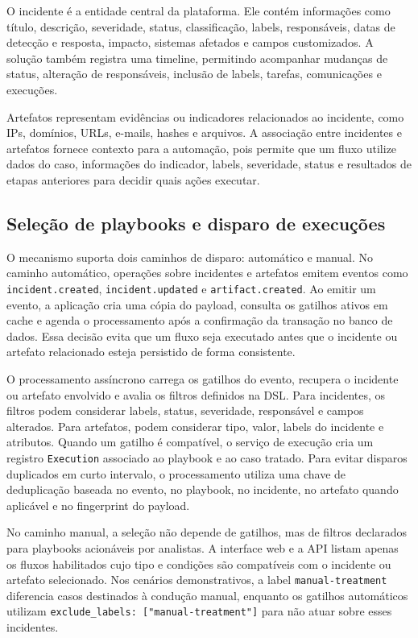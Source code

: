 \documentclass[article,a4paper,12pt,english,brazil,sumario=tradicional]{abntex2}
\begin{document}
O incidente é a entidade central da plataforma. Ele contém informações como título, descrição, severidade, status, classificação, labels, responsáveis, datas de detecção e resposta, impacto, sistemas afetados e campos customizados. A solução também registra uma timeline, permitindo acompanhar mudanças de status, alteração de responsáveis, inclusão de labels, tarefas, comunicações e execuções.

Artefatos representam evidências ou indicadores relacionados ao incidente, como IPs, domínios, URLs, e-mails, hashes e arquivos. A associação entre incidentes e artefatos fornece contexto para a automação, pois permite que um fluxo utilize dados do caso, informações do indicador, labels, severidade, status e resultados de etapas anteriores para decidir quais ações executar.

\subsection{Seleção de playbooks e disparo de execuções}

O mecanismo suporta dois caminhos de disparo: automático e manual. No caminho automático, operações sobre incidentes e artefatos emitem eventos como \texttt{incident.created}, \texttt{incident.updated} e \texttt{artifact.created}. Ao emitir um evento, a aplicação cria uma cópia do payload, consulta os gatilhos ativos em cache e agenda o processamento após a confirmação da transação no banco de dados. Essa decisão evita que um fluxo seja executado antes que o incidente ou artefato relacionado esteja persistido de forma consistente.

O processamento assíncrono carrega os gatilhos do evento, recupera o incidente ou artefato envolvido e avalia os filtros definidos na DSL. Para incidentes, os filtros podem considerar labels, status, severidade, responsável e campos alterados. Para artefatos, podem considerar tipo, valor, labels do incidente e atributos. Quando um gatilho é compatível, o serviço de execução cria um registro \texttt{Execution} associado ao playbook e ao caso tratado. Para evitar disparos duplicados em curto intervalo, o processamento utiliza uma chave de deduplicação baseada no evento, no playbook, no incidente, no artefato quando aplicável e no fingerprint do payload.

No caminho manual, a seleção não depende de gatilhos, mas de filtros declarados para playbooks acionáveis por analistas. A interface web e a API listam apenas os fluxos habilitados cujo tipo e condições são compatíveis com o incidente ou artefato selecionado. Nos cenários demonstrativos, a label \texttt{manual-treatment} diferencia casos destinados à condução manual, enquanto os gatilhos automáticos utilizam \texttt{exclude\_labels: ["manual-treatment"]} para não atuar sobre esses incidentes.
\end{document}
